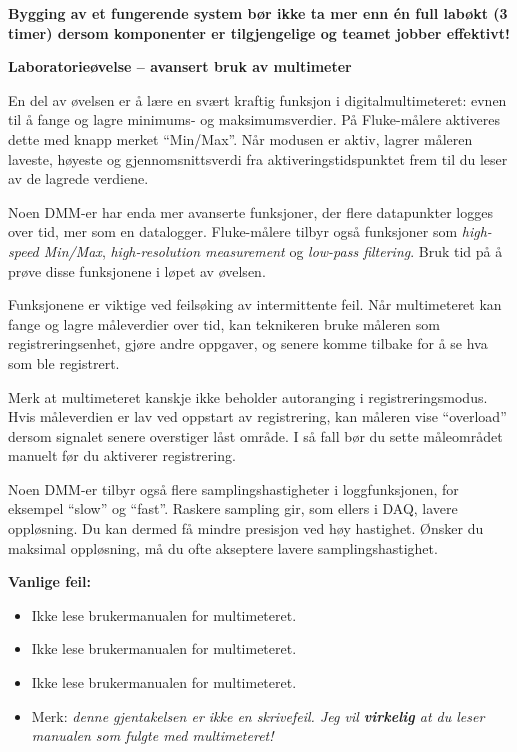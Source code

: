 \vskip 10pt

{\bf Bygging av et fungerende system bør ikke ta mer enn én full labøkt (3 timer) dersom komponenter er tilgjengelige og teamet jobber effektivt!}





\vfil \eject

\noindent
{\bf Laboratorieøvelse -- avansert bruk av multimeter}

\vskip 5pt

En del av øvelsen er å lære en svært kraftig funksjon i digitalmultimeteret: evnen til å fange og lagre minimums- og maksimumsverdier. På Fluke-målere aktiveres dette med knapp merket ``Min/Max''. Når modusen er aktiv, lagrer måleren laveste, høyeste og gjennomsnittsverdi fra aktiveringstidspunktet frem til du leser av de lagrede verdiene.

Noen DMM-er har enda mer avanserte funksjoner, der flere datapunkter logges over tid, mer som en datalogger. Fluke-målere tilbyr også funksjoner som {\it high-speed Min/Max}, {\it high-resolution measurement} og {\it low-pass filtering}. Bruk tid på å prøve disse funksjonene i løpet av øvelsen.

\vskip 10pt

Funksjonene er viktige ved feilsøking av intermittente feil. Når multimeteret kan fange og lagre måleverdier over tid, kan teknikeren bruke måleren som registreringsenhet, gjøre andre oppgaver, og senere komme tilbake for å se hva som ble registrert.

\vskip 10pt

Merk at multimeteret kanskje ikke beholder autoranging i registreringsmodus. Hvis måleverdien er lav ved oppstart av registrering, kan måleren vise ``overload'' dersom signalet senere overstiger låst område. I så fall bør du sette måleområdet manuelt før du aktiverer registrering.

Noen DMM-er tilbyr også flere samplingshastigheter i loggfunksjonen, for eksempel ``slow'' og ``fast''. Raskere sampling gir, som ellers i DAQ, lavere oppløsning. Du kan dermed få mindre presisjon ved høy hastighet. Ønsker du maksimal oppløsning, må du ofte akseptere lavere samplingshastighet.

\vskip 10pt

{\bf Vanlige feil:}

\begin{itemize}
\item{} Ikke lese brukermanualen for multimeteret.
\item{} Ikke lese brukermanualen for multimeteret.
\item{} Ikke lese brukermanualen for multimeteret.
\item{} Merk: {\it denne gjentakelsen er ikke en skrivefeil. Jeg vil {\bf virkelig} at du leser manualen som fulgte med multimeteret!}
\end{itemize}





